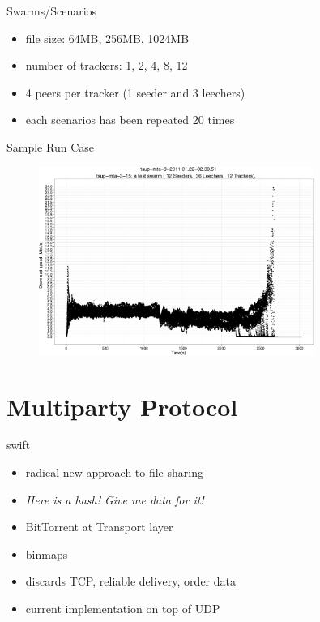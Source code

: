 \documentclass{beamer}
\begin{document}
\begin{frame}{Swarms/Scenarios}
  \begin{itemize}
    \item file size: 64MB, 256MB, 1024MB
    \item number of trackers: 1, 2, 4, 8, 12
    \item 4 peers per tracker (1 seeder and 3 leechers)
    \item each scenarios has been repeated 20 times
  \end{itemize}
\end{frame}

\begin{frame}{Sample Run Case}
  \begin{figure}
    \includegraphics[width=0.8\textwidth]{img/tsup-sample-run-48peers.png}
  \end{figure}
\end{frame}

\section{Multiparty Protocol}

\begin{frame}{swift}
  \begin{itemize}
    \item radical new approach to file sharing
    \item \textit{Here is a hash! Give me data for it!}
    \item BitTorrent at Transport layer
    \item binmaps
    \item discards TCP, reliable delivery, order data
    \item current implementation on top of UDP
  \end{itemize}
\end{frame}
\end{document}
